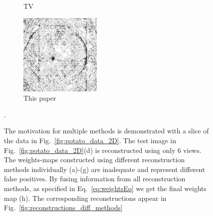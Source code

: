 \documentclass[journal]{IEEEtran}
\begin{document}
\begin{figure}[!h]
\begin{subfigure}[b]{0.24\linewidth}
        \caption{TV}
     \end{subfigure}
    \begin{subfigure}[b]{0.24\linewidth}
        \includegraphics[width=\textwidth]{../images/potato/post_tci/comparison/weightsIm_all_methods30.png}
        \caption{This paper}
     \end{subfigure}
      \caption{The motivation for multiple methods is demonstrated
        with a slice of the data in Fig.~\ref{fig:potato_data_2D}.
        The test image in Fig.~\ref{fig:potato_data_2D}(d) is
        reconstructed using only $6$ views.  The weights-maps
        constructed using different
        reconstruction methods individually (a)-(g) are inadequate and
        represent different false positives. By fusing information
        from all reconstruction methods, as specified in
        Eq.~\ref{eq:weightsEq} we get the final weights map (h). The corresponding reconstructions appear in Fig.~\ref{fig:reconstructions_diff_methods}}.
\label{fig:weights_map_2Dpotato}
\end{figure}
\end{document}
